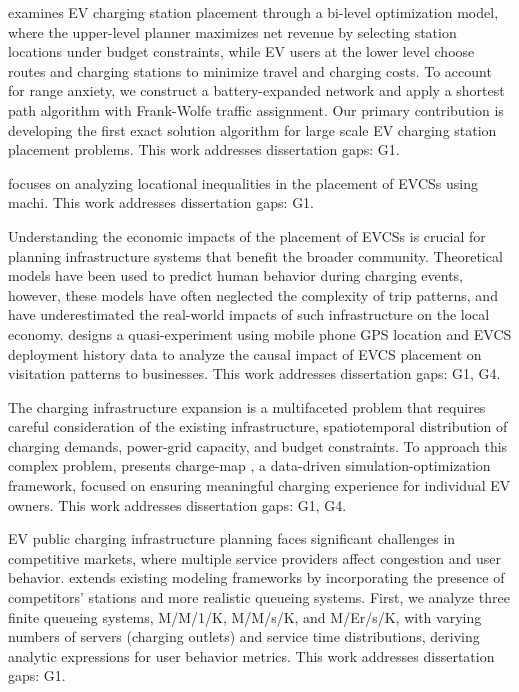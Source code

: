 \documentclass[letterpaper, 12pt, oneside, doublespacing]{Thesis}
\begin{document}
\noindent \cite{an_exact_2025} examines EV charging station placement through a bi-level optimization model, where the upper-level planner maximizes net revenue by selecting station locations under budget constraints, while EV users at the lower level choose routes and charging stations to minimize travel and charging costs. To account for range anxiety, we construct a battery-expanded network and apply a shortest path algorithm with Frank-Wolfe traffic assignment. Our primary contribution is developing the first exact solution algorithm for large scale EV charging station placement problems. This work addresses dissertation gaps: G1.



\noindent \cite{analyzing_locational_2025} focuses on analyzing locational inequalities in the placement of EVCSs using machi. This work addresses dissertation gaps: G1.



\noindent Understanding the economic impacts of the placement of EVCSs is crucial for planning infrastructure systems that benefit the broader community. Theoretical models have been used to predict human behavior during charging events, however, these models have often neglected the complexity of trip patterns, and have underestimated the real-world impacts of such infrastructure on the local economy. \cite{causal_spillover_2025} designs a quasi-experiment using mobile phone GPS location and EVCS deployment history data to analyze the causal impact of EVCS placement on visitation patterns to businesses. This work addresses dissertation gaps: G1, G4.



\noindent The charging infrastructure expansion is a multifaceted problem that requires careful consideration of the existing infrastructure, spatiotemporal distribution of charging demands, power-grid capacity, and budget constraints. To approach this complex problem, \cite{charge-map_an_2025} presents charge-map , a data-driven simulation-optimization framework, focused on ensuring meaningful charging experience for individual EV owners. This work addresses dissertation gaps: G1, G4.



\noindent EV public charging infrastructure planning faces significant challenges in competitive markets, where multiple service providers affect congestion and user behavior. \cite{competitive_ev_2025} extends existing modeling frameworks by incorporating the presence of competitors' stations and more realistic queueing systems. First, we analyze three finite queueing systems, M/M/1/K, M/M/s/K, and M/Er/s/K, with varying numbers of servers (charging outlets) and service time distributions, deriving analytic expressions for user behavior metrics. This work addresses dissertation gaps: G1.
\end{document}
